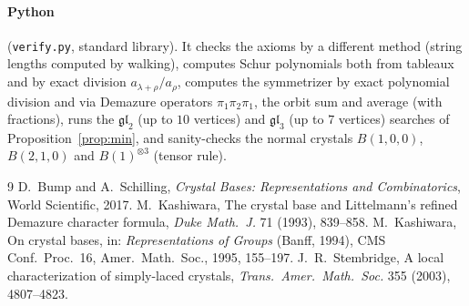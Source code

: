\documentclass[11pt]{article}
\theoremstyle{definition}
\theoremstyle{remark}
\begin{document}
\paragraph{Python} (\texttt{verify.py}, standard library). It checks the axioms by a different
method (string lengths computed by walking), computes Schur polynomials both from tableaux and
by exact division $a_{\lambda+\rho}/a_\rho$, computes the symmetrizer by exact polynomial
division and via Demazure operators $\pi_1\pi_2\pi_1$, the orbit sum and average (with
fractions), runs the $\mathfrak{gl}_2$ (up to $10$ vertices) and $\mathfrak{gl}_3$ (up to $7$
vertices) searches of Proposition~\ref{prop:min}, and sanity-checks the normal crystals
$B(1,0,0)$, $B(2,1,0)$ and $B(1)^{\otimes3}$ (tensor rule).

\begin{thebibliography}{9}
 D.~Bump and A.~Schilling, \emph{Crystal Bases: Representations and
Combinatorics}, World Scientific, 2017.
 M.~Kashiwara, The crystal base and Littelmann's refined Demazure character
formula, \emph{Duke Math.\ J.} 71 (1993), 839--858.
 M.~Kashiwara, On crystal bases, in: \emph{Representations of Groups}
(Banff, 1994), CMS Conf.\ Proc.\ 16, Amer.\ Math.\ Soc., 1995, 155--197.
 J.~R.~Stembridge, A local characterization of simply-laced crystals,
\emph{Trans.\ Amer.\ Math.\ Soc.} 355 (2003), 4807--4823.
\end{thebibliography}
\end{document}
